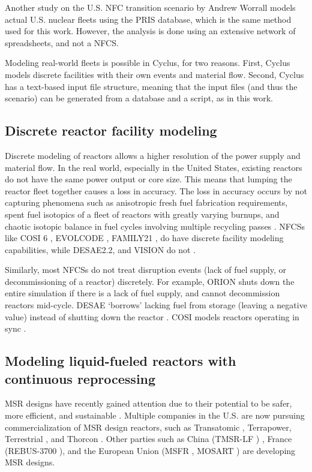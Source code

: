 Another study on the U.S. \gls{NFC} transition scenario by Andrew Worrall \cite{worrall_utilization_2013}
models actual U.S. nuclear fleets using the \gls{PRIS} database, which is the same
method used for this work. However, the analysis is done using an extensive
network of spreadsheets, and not a \gls{NFCS}.

Modeling real-world fleets is possible in Cyclus, for two
reasons. First, Cyclus models
discrete facilities with their own events and material flow.
Second, Cyclus has a text-based input file structure, meaning that
the input files (and thus the scenario) can be generated from 
a database and a script, as in this work.


\subsection{Discrete reactor facility modeling}
Discrete modeling of reactors allows a higher resolution of the power supply and
material flow. In the real world, especially in the United States, existing
reactors do not have the same power output or core size. This means that
lumping the reactor fleet together causes a loss in accuracy. The loss in
accuracy occurs by not capturing phenomena such as anisotropic fresh fuel
fabrication requirements, spent fuel isotopics of a fleet of reactors
with greatly varying burnups, and chaotic isotopic balance in fuel
cycles involving multiple recycling passes \cite{huff_next_2010}.
\glspl{NFCS} like COSI 6 \cite{meyer_new_2009}, EVOLCODE \cite{alvarez-velarde_validation_2014},
FAMILY21 \cite{oecd_nuclear_2009},
do have discrete facility modeling capabilities, while
DESAE2.2\cite{tsibulskiy_desae_2006}, and VISION \cite{jacobson_verifiable_2010} do
not \cite{boucher_international_2010}.

Similarly, most \glspl{NFCS} do not treat disruption events (lack of fuel supply,
or decommissioning of a reactor)
discretely. For example, ORION shuts down the entire simulation if there
is a lack of fuel supply, and cannot decommission reactors mid-cycle.
DESAE `borrows' lacking fuel from storage (leaving a
negative value) instead of shutting down the reactor \cite{mccarthy_benchmark_2012}.
COSI models reactors operating in sync \cite{boucher_benchmark_2012}.


\subsection{Modeling liquid-fueled reactors with continuous reprocessing}
\label{sec:msr}
\gls{MSR} designs have recently gained attention due to 
their potential to be 
safer, more efficient, and sustainable \cite{serp_molten_2014}.
Multiple companies in the U.S. are now pursuing
commercialization of \gls{MSR} design reactors, such as Transatomic \cite{transatomic_power_corporation_technical_2016}
, Terrapower, Terrestrial \cite{leblanc_18_2017}, and
Thorcon \cite{jorgensen_19_2017}. Other parties such as China (TMSR-LF \cite{dai_17_2017}) ,
France (REBUS-3700 \cite{mourogov_potentialities_2006}),
and the European Union (MSFR \cite{heuer_towards_2014}, MOSART \cite{ignatiev_molten_2014})
are developing \gls{MSR} designs.

